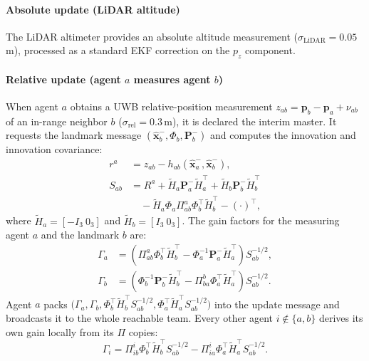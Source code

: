 \documentclass[journal,10pt,twocolumn]{IEEEtran}
\begin{document}
\paragraph{Absolute update (LiDAR altitude)}
The LiDAR altimeter provides an absolute altitude measurement
($\sigma_{\text{LiDAR}} = 0.05$\,m), processed as a standard EKF
correction on the $p_z$ component.

\paragraph{Relative update (agent $a$ measures agent $b$)}
When agent $a$ obtains a UWB relative-position measurement
$z_{ab} = \mathbf{p}_b - \mathbf{p}_a + \nu_{ab}$ of an in-range
neighbor $b$ ($\sigma_{\text{rel}} = 0.3$\,m), it is declared the
interim master.  It requests the landmark message
$(\hat{\mathbf{x}}^-_b, \Phi_b, \mathbf{P}^-_b)$ and computes the
innovation and innovation covariance:
\begin{align}
  r^a &= z_{ab} - h_{ab}(\hat{\mathbf{x}}^-_a, \hat{\mathbf{x}}^-_b),\\
  S_{ab} &= R^a + \tilde{H}_a \mathbf{P}^-_a \tilde{H}_a^\top
    + \tilde{H}_b \mathbf{P}^-_b \tilde{H}_b^\top \nonumber\\
    &\quad - \tilde{H}_a \Phi_a \Pi^a_{ab} \Phi_b^\top \tilde{H}_b^\top
    - (\cdot)^\top,
  \label{eq:imdcl_innov}
\end{align}
where $\tilde{H}_a = [-I_3\ 0_3]$ and $\tilde{H}_b = [I_3\ 0_3]$.
The gain factors for the measuring agent $a$ and the landmark $b$ are:
\begin{align}
  \Gamma_a &= \left( \Pi^a_{ab} \Phi_b^\top \tilde{H}_b^\top
    - \Phi_a^{-1} \mathbf{P}^-_a \tilde{H}_a^\top \right) S_{ab}^{-1/2},
  \label{eq:imdcl_gamma_a}\\
  \Gamma_b &= \left( \Phi_b^{-1} \mathbf{P}^-_b \tilde{H}_b^\top
    - \Pi^b_{ba} \Phi_a^\top \tilde{H}_a^\top \right) S_{ab}^{-1/2}.
  \label{eq:imdcl_gamma_b}
\end{align}
Agent $a$ packs $\big(\Gamma_a, \Gamma_b,
\Phi_b^\top \tilde{H}_b^\top S_{ab}^{-1/2},
\Phi_a^\top \tilde{H}_a^\top S_{ab}^{-1/2}\big)$ into the update message
and broadcasts it to the whole reachable team.  Every other agent
$i \notin \{a,b\}$ derives its own gain locally from its $\Pi$ copies:
\begin{equation}
  \Gamma_i = \Pi^i_{ib} \Phi_b^\top \tilde{H}_b^\top S_{ab}^{-1/2}
    - \Pi^i_{ia} \Phi_a^\top \tilde{H}_a^\top S_{ab}^{-1/2}.
  \label{eq:imdcl_gamma_i}
\end{equation}
\end{document}
